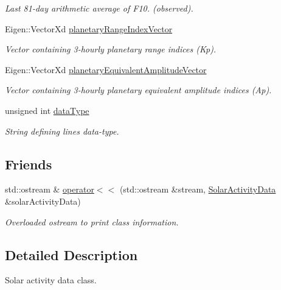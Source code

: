 \begin{DoxyCompactItemize}
\begin{DoxyCompactList}\small\item\em Last 81-\/day arithmetic average of F10. (observed). \end{DoxyCompactList}\item 
Eigen\+::\+Vector\+Xd \hyperlink{structtudat_1_1input__output_1_1solar__activity_1_1SolarActivityData_ad7ec64845a94f3ccf034e25ad852d050}{planetary\+Range\+Index\+Vector}
\begin{DoxyCompactList}\small\item\em Vector containing 3-\/hourly planetary range indices (Kp). \end{DoxyCompactList}\item 
Eigen\+::\+Vector\+Xd \hyperlink{structtudat_1_1input__output_1_1solar__activity_1_1SolarActivityData_aa07f46cc182b16ce6850aa0d812e731e}{planetary\+Equivalent\+Amplitude\+Vector}
\begin{DoxyCompactList}\small\item\em Vector containing 3-\/hourly planetary equivalent amplitude indices (Ap). \end{DoxyCompactList}\item 
unsigned int \hyperlink{structtudat_1_1input__output_1_1solar__activity_1_1SolarActivityData_a594d19abac77a3fc12581ed2dc3e1610}{data\+Type}
\begin{DoxyCompactList}\small\item\em String defining line\textquotesingle{}s data-\/type. \end{DoxyCompactList}\end{DoxyCompactItemize}
\subsection*{Friends}
\begin{DoxyCompactItemize}
\item 
std\+::ostream \& \hyperlink{structtudat_1_1input__output_1_1solar__activity_1_1SolarActivityData_af065fc676d746df436db62b6248e333d}{operator$<$$<$} (std\+::ostream \&stream, \hyperlink{structtudat_1_1input__output_1_1solar__activity_1_1SolarActivityData}{Solar\+Activity\+Data} \&solar\+Activity\+Data)
\begin{DoxyCompactList}\small\item\em Overloaded ostream to print class information. \end{DoxyCompactList}\end{DoxyCompactItemize}


\subsection{Detailed Description}
Solar activity data class. 

